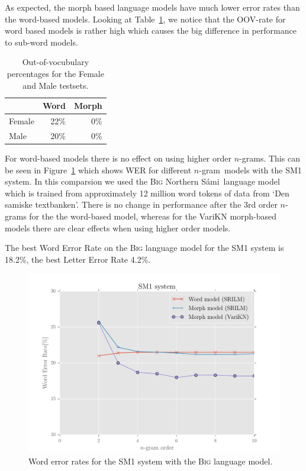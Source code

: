\documentclass[b5paper]{article}
\newcommand{\ns}{Northern Sámi}
\newcommand{\ngram}{$n$-gram}
\newcommand{\ds}[1]{\textsc{#1}}
\begin{document}
As expected, the morph based language models have much lower error rates than the word-based models. Looking at Table~\ref{tbl:samioov}, we notice that the OOV-rate for word based models is rather high which causes the big difference in performance to sub-word models. %

\begin{table}[!h]
\centering
\begin{tabular}{lrr}
& Word & Morph\\\hline
Female &  22\% & 0\% \\
Male & 20\% & 0\%\\
\end{tabular}
\caption{Out-of-vocubulary percentages for the Female and Male testsets. \label{tbl:samioov}}
\end{table}


For word-based models there is no effect on using higher order \ngram s. This can be seen in Figure~\ref{fig:samiperf}  which shows WER for different \ngram\ models with the SM1 system. In this comparsion we used the \ds{Big} \ns\ language model which is trained from approximately 12 million word tokens of data from `Den samiske textbanken'. There is no change in performance after the 3rd order \ngram s for the the word-based model, whereas for the VariKN morph-based models there are clear effects when using higher order models. 


The best Word Error Rate on the \ds{Big} language model for the SM1 system is 18.2\%, the best Letter Error Rate 4.2\%. 

\begin{figure}
\centering
\includegraphics[width=.86\textwidth]{figures/sme1}
\caption{Word error rates for the SM1 system with the \ds{Big} language model.}\label{fig:samiperf}

\end{figure}
\end{document}
